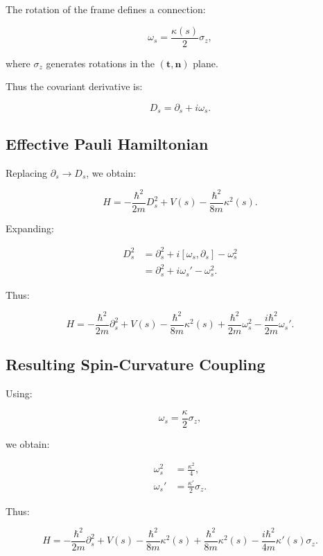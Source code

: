 \documentclass[11pt]{article}
\begin{document}
The rotation of the frame defines a connection:

\[
\omega_s = \frac{\kappa(s)}{2} \sigma_z,
\]

where $\sigma_z$ generates rotations in the $(\mathbf{t},\mathbf{n})$ plane.

Thus the covariant derivative is:

\begin{equation}
D_s = \partial_s + i \omega_s.
\end{equation}

\subsection{Effective Pauli Hamiltonian}

Replacing $\partial_s \to D_s$, we obtain:

\begin{equation}
H =
-\frac{\hbar^2}{2m} D_s^2
+ V(s)
-\frac{\hbar^2}{8m}\kappa^2(s).
\end{equation}

Expanding:

\begin{align}
D_s^2 &= \partial_s^2 + i[\omega_s,\partial_s] - \omega_s^2 \\
&= \partial_s^2 + i \omega_s' - \omega_s^2.
\end{align}

Thus:

\begin{equation}
H =
-\frac{\hbar^2}{2m}\partial_s^2
+ V(s)
-\frac{\hbar^2}{8m}\kappa^2(s)
+ \frac{\hbar^2}{2m}\omega_s^2
- \frac{i\hbar^2}{2m}\omega_s'.
\end{equation}

\subsection{Resulting Spin-Curvature Coupling}

Using:

\[
\omega_s = \frac{\kappa}{2}\sigma_z,
\]

we obtain:

\begin{align}
\omega_s^2 &= \frac{\kappa^2}{4}, \\
\omega_s' &= \frac{\kappa'}{2}\sigma_z.
\end{align}

Thus:

\begin{equation}
H =
-\frac{\hbar^2}{2m}\partial_s^2
+ V(s)
- \frac{\hbar^2}{8m}\kappa^2(s)
+ \frac{\hbar^2}{8m}\kappa^2(s)
- \frac{i\hbar^2}{4m}\kappa'(s)\sigma_z.
\end{equation}
\end{document}
